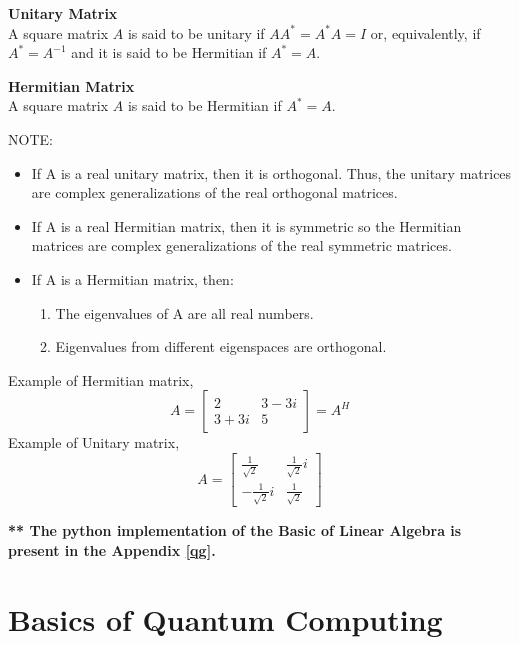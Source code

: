\documentclass[12pt]{report}
\begin{document}
\begin{defn}
\textbf{Unitary Matrix}\\
A square matrix $A$ is said to be unitary if $AA^\ast = A^\ast A = I $ or, equivalently, if $A^\ast = A^{-1}$ and it is said to be Hermitian if $A^\ast = A$.\\
\end{defn}
\begin{defn}\textbf{Hermitian Matrix}\\A square matrix $A$ is said to be Hermitian if $A^\ast = A$.
\end{defn}
NOTE: 
\begin{itemize}
	\item If A is a real unitary matrix, then  it is orthogonal. Thus, the unitary matrices are complex generalizations of the real orthogonal matrices.
	\item If A is a real Hermitian matrix, then  it is symmetric so the Hermitian matrices are complex generalizations of the real symmetric matrices.
	\item If A is a Hermitian matrix, then:
	\begin{enumerate}
		\item The eigenvalues of A are all real numbers.
		\item Eigenvalues from different eigenspaces are orthogonal.
	\end{enumerate}
\end{itemize}	



Example of Hermitian matrix, 
\begin{equation*}
A=\begin{bmatrix}
2&3-3i\\
3+3i&5
\end{bmatrix} = A^H
\end{equation*}
Example of Unitary matrix,
\begin{equation*}
A=\begin{bmatrix}
\frac{1}{\sqrt{2}}&\frac{1}{\sqrt{2}}i\\
-\frac{1}{\sqrt{2}}i&\frac{1}{\sqrt{2}}
\end{bmatrix}
\end{equation*}

\textbf{** The python implementation of the Basic of Linear Algebra is present in the Appendix \ref{qg}.}
\newpage
\section{Basics of Quantum Computing}
\end{document}
